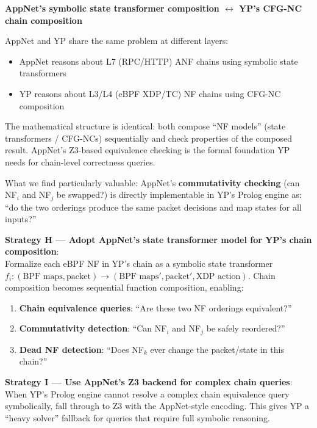 \begin{analogybox}
\textbf{AppNet's symbolic state transformer composition $\leftrightarrow$ YP's CFG-NC chain composition}

AppNet and YP share the same problem at different layers:
\begin{itemize}
  \item AppNet reasons about L7 (RPC/HTTP) ANF chains using symbolic state transformers
  \item YP reasons about L3/L4 (eBPF XDP/TC) NF chains using CFG-NC composition
\end{itemize}

The mathematical structure is identical: both compose ``NF models'' (state transformers / CFG-NCs) sequentially and check properties of the composed result. AppNet's Z3-based equivalence checking is the formal foundation YP needs for chain-level correctness queries.

What we find particularly valuable: AppNet's \textbf{commutativity checking} (can NF$_i$ and NF$_j$ be swapped?) is directly implementable in YP's Prolog engine as: ``do the two orderings produce the same packet decisions and map states for all inputs?''
\end{analogybox}

\begin{strategybox}
\textbf{Strategy H --- Adopt AppNet's state transformer model for YP's chain composition}:\\
Formalize each eBPF NF in YP's chain as a symbolic state transformer $f_i: (\text{BPF maps}, \text{packet}) \to (\text{BPF maps}', \text{packet}', \text{XDP action})$. Chain composition becomes sequential function composition, enabling:
\begin{enumerate}
  \item \textbf{Chain equivalence queries}: ``Are these two NF orderings equivalent?''
  \item \textbf{Commutativity detection}: ``Can NF$_i$ and NF$_j$ be safely reordered?''
  \item \textbf{Dead NF detection}: ``Does NF$_k$ ever change the packet/state in this chain?''
\end{enumerate}

\textbf{Strategy I --- Use AppNet's Z3 backend for complex chain queries}:\\
When YP's Prolog engine cannot resolve a complex chain equivalence query symbolically, fall through to Z3 with the AppNet-style encoding. This gives YP a ``heavy solver'' fallback for queries that require full symbolic reasoning.
\end{strategybox}

